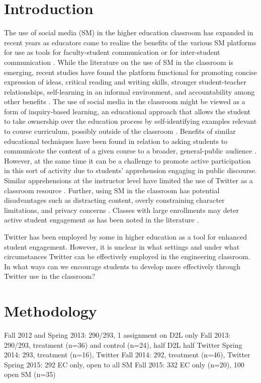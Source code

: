 \documentclass[12pt]{article}
\begin{document}
\section*{Introduction}
The use of social media (SM) in the higher education classroom has expanded in recent years as educators come to realize the benefits of the various SM platforms for use as tools for faculty-student communication or for inter-student communication \cite{blessing_using_2012}. While the literature on the use of SM in the classroom is emerging, recent studies have found the platform functional for promoting concise expression of ideas, critical reading and writing skills, stronger student-teacher relationships, self-learning in an informal environment, and accountability among other benefits \cite{shiffman_twitter_2012}. The use of social media in the classroom might be viewed as a form of inquiry-based learning, an educational approach that allows the student to take ownership over the education process by self-identifying examples relevant to course curriculum, possibly outside of the classroom \cite{magnussen_impact_2000, prince_does_2004}. Benefits of similar educational techniques have been found in relation to asking students to communicate the content of a given course to a broader, general-public audience \cite{junco_effect_2011, ha_influence_2013}. However, at the same time it can be a challenge to promote active participation in this sort of activity due to students’ apprehension engaging in public discourse. Similar apprehensions at the instructor level have limited the use of Twitter as a classroom resource \cite{carpenter_how_2014}. Further, using SM in the classroom has potential disadvantages such as distracting content, overly constraining character limitations, and privacy concerns \cite{dhir_tweeters_2013}. Classes with large enrollments may deter active student engagement as has been noted in the literature \cite{ahlfeldt_measurement_2005}.  

Twitter has been employed by some in higher education as a tool for enhanced student engagement. However, it is unclear in what settings and under what circumstances Twitter can be effectively employed in the engineering classroom. In what ways can we encourage students to develop more effectively through Twitter use in the classroom?


\section*{Methodology}
Fall 2012 and Spring 2013: 290/293, 1 assignment on D2L only
Fall 2013: 290/293, treatment (n=36) and control (n=24), half D2L half Twitter
Spring 2014: 293, treatment (n=16), Twitter
Fall 2014: 292, treatment (n=46), Twitter
Spring 2015: 292 EC only, open to all SM
Fall 2015: 332 EC only (n=20), 100 open SM (n=35)
\end{document}

